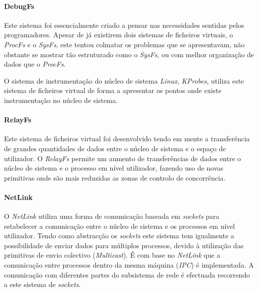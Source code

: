 \paragraph*{DebugFs}\label{cap:DebugFs_overview}

Este sistema foi essencialmente criado a pensar nas necessidades sentidas pelos programadores.
Apesar de já existirem dois sistemas de ficheiros virtuais, o \textit{ProcFs} e o \textit{SysFs}, este tentou colmatar os problemas que se apresentavam, não obstante se mostrar tão estruturado como o \textit{SysFs}, ou com melhor organização de dados que o \textit{ProcFs}.

O sistema de instrumentação do núcleo de sistema \textit{Linux}, \textit{KProbes}, utiliza este sistema de ficheiros virtual de forma a apresentar os pontos onde existe instrumentação no núcleo de sistema.

\paragraph*{RelayFs}\label{cap:RelayFs_overview}

Este sistema de ficheiros virtual foi desenvolvido tendo em mente a transferência de grandes quantidades de dados entre o núcleo de sistema e o espaço de utilizador.
O \textit{RelayFs} permite um aumento de transferências de dados entre o núcleo de sistema e o processo em nível utilizador, fazendo uso de novas primitivas onde são mais reduzidas as zonas de controlo de concorrência\cite{Donovan2007}.

\paragraph*{NetLink}\label{cap:NetLink_overview}
O \textit{NetLink} utiliza uma forma de comunicação baseada em \textit{sockets} para estabelecer a comunicação entre o núcleo de sistema e os processos em nível utilizador. 
 Tendo como abstracção os \textit{sockets} este sistema tem igualmente a possibilidade de enviar dados para múltiplos processos, devido à utilização das primitivas de envio colectivo (\textit{Multicast}).
 É com base no \textit{NetLink} que a comunicação entre processos dentro da mesma máquina (\textit{IPC}) é implementada.
 A comunicação com diferentes partes do subsistema de rede é efectuada recorrendo a este sistema de \textit{sockets}.


